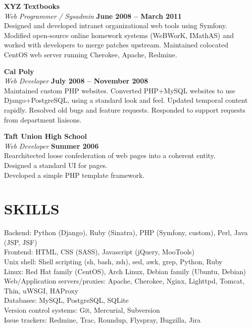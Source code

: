 \documentclass[margin,line]{resume}
\begin{document}
\begin{resume}
    \textbf{\listing XYZ Textbooks} \vspace{2mm}\\\vspace{1mm}%
    \textsl{Web Programmer / Sysadmin} \hfill \textbf{June 2008 -- March 2011}\\
    Designed and developed intranet organizational web tools using Symfony.
    Modified open-source online homework systems (WeBWorK, IMathAS) and worked with developers to merge patches upstream.
    Maintained colocated CentOS web server running Cherokee, Apache, Redmine.
    
    \textbf{\listing Cal Poly} \vspace{2mm}\\\vspace{1mm}%
    \textsl{Web Developer} \hfill \textbf{July 2008 -- November 2008}\\
    Maintained custom PHP websites.
    Converted PHP+MySQL websites to use Django+PostgreSQL, using a standard look and feel.
    Updated temporal content rapidly.
    Resolved old bugs and feature requests.
    Responded to support requests from department liaisons.

    \textbf{\listing Taft Union High School} \vspace{2mm}\\\vspace{1mm}%
    \textsl{Web Developer} \hfill \textbf{Summer 2006}\\
    Rearchitected loose confederation of web pages into a coherent entity.\\
    Designed a standard UI for pages.\\
    Developed a simple PHP template framework.

\sectionline

    \section{\mysidestyle \textbf{\large{S}\small{KILLS}}}

    Backend: Python (Django), Ruby (Sinatra), PHP (Symfony, custom), Perl, Java (JSP, JSF)\\
    Frontend: HTML, CSS (SASS), Javascript (jQuery, MooTools)\\
    Unix shell: Shell scripting (sh, bash, zsh), sed, awk, grep, Python, Ruby\\
    Linux: Red Hat family (CentOS), Arch Linux, Debian family (Ubuntu, Debian)\\
    Web/Application servers/proxies: Apache, Cherokee, Nginx, Lighttpd, Tomcat, Thin, uWSGI, HAProxy\\
    Databases: MySQL, PostgreSQL, SQLite\\
    Version control systems: Git, Mercurial, Subversion\\
    Issue trackers: Redmine, Trac, Roundup, Flyspray, Bugzilla, Jira\\


\end{resume}
\end{document}
